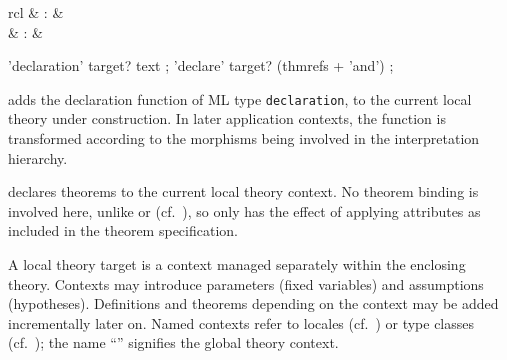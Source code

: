 \begin{isabellebody}
\begin{isamarkuptext}
  \begin{matharray}{rcl}
    \hypertarget{command.declaration}{\hyperlink{command.declaration}{\mbox{}}} & : &  \\
    \hypertarget{command.declare}{\hyperlink{command.declare}{\mbox{}}} & : &  \\
  \end{matharray}

  \begin{rail}
    'declaration' target? text
    ;
    'declare' target? (thmrefs + 'and')
    ;
  \end{rail}

  \begin{descr}

  \item [\hyperlink{command.declaration}{\mbox{\isa{\isacommand{declaration}}}}~\isa{d}] adds the declaration
  function  of ML type \verb|declaration|, to the current
  local theory under construction.  In later application contexts, the
  function is transformed according to the morphisms being involved in
  the interpretation hierarchy.

  \item [\hyperlink{command.declare}{\mbox{\isa{\isacommand{declare}}}}~\isa{thms}] declares theorems to the
  current local theory context.  No theorem binding is involved here,
  unlike \hyperlink{command.theorems}{\mbox{}} or \hyperlink{command.lemmas}{\mbox{}} (cf.\
  ), so \hyperlink{command.declare}{\mbox{}} only has the effect
  of applying attributes as included in the theorem specification.

  \end{descr}%
\end{isamarkuptext}%
\isamarkuptrue%
%
\isamarkuptrue%
%
\begin{isamarkuptext}%
A local theory target is a context managed separately within the
  enclosing theory.  Contexts may introduce parameters (fixed
  variables) and assumptions (hypotheses).  Definitions and theorems
  depending on the context may be added incrementally later on.  Named
  contexts refer to locales (cf.\ \secref{sec:locale}) or type classes
  (cf.\ \secref{sec:class}); the name ``\isa{{\isachardoublequote}{\isacharminus}{\isachardoublequote}}'' signifies the
  global theory context.


\end{isamarkuptext}
\end{isabellebody}
